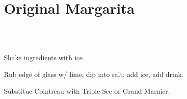 \section[Original Margarita]{Original Margarita~\vegan}


\begin{recipestats}[
	servings=1,
	preptime=5 \minute,
	source=\citefield{cointreauMargarita}{shorttitle}\cite{cointreauMargarita},
]
\end{recipestats}


\begin{ingredientcolumns}[1]
	\begin{ingredientblock}
		\\
		\\
	\end{ingredientblock}
\end{ingredientcolumns}


\begin{preparation}
\item Shake ingredients with ice.
\item Rub edge of glass w/ lime, dip into salt, add ice, add drink.
\end{preparation}


\begin{variation}
\item Substitue Cointreau with Triple Sec or Grand Marnier.
\end{variation}

\recipeend
